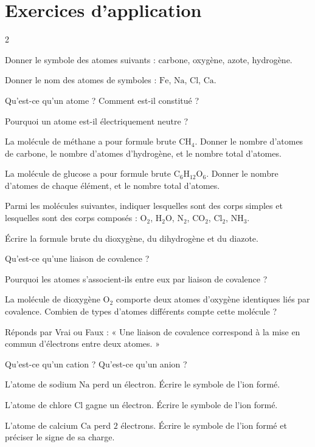 \section{Exercices d'application}
\begin{multicols}{2}

\exo{} Donner le symbole des atomes suivants : carbone, oxygène, azote,
hydrogène.

\exo{} Donner le nom des atomes de symboles : $\mathrm{Fe}$, $\mathrm{Na}$,
$\mathrm{Cl}$, $\mathrm{Ca}$.

\exo{} Qu'est-ce qu'un atome ? Comment est-il constitué ?

\exo{} Pourquoi un atome est-il électriquement neutre ?

\exo{} La molécule de méthane a pour formule brute $\mathrm{CH_4}$. Donner le
nombre d'atomes de carbone, le nombre d'atomes d'hydrogène, et le nombre total d'atomes.

\exo{} La molécule de glucose a pour formule brute $\mathrm{C_6H_{12}O_6}$. Donner
le nombre d'atomes de chaque élément, et le nombre total d'atomes.

\exo{} Parmi les molécules suivantes, indiquer lesquelles sont des corps simples et
lesquelles sont des corps composés : $\mathrm{O_2}$, $\mathrm{H_2O}$, $\mathrm{N_2}$,
$\mathrm{CO_2}$, $\mathrm{Cl_2}$, $\mathrm{NH_3}$.

\exo{} Écrire la formule brute du dioxygène, du dihydrogène et du diazote.

\exo{} Qu'est-ce qu'une liaison de covalence ?

\exo{} Pourquoi les atomes s'associent-ils entre eux par liaison de covalence ?

\exo{} La molécule de dioxygène $\mathrm{O_2}$ comporte deux atomes d'oxygène
identiques liés par covalence. Combien de types d'atomes différents compte cette
molécule ?

\exo{} Réponds par Vrai ou Faux : « Une liaison de covalence correspond à la mise
en commun d'électrons entre deux atomes. »

\exo{} Qu'est-ce qu'un cation ? Qu'est-ce qu'un anion ?

\exo{} L'atome de sodium $\mathrm{Na}$ perd un électron. Écrire le symbole de
l'ion formé.

\exo{} L'atome de chlore $\mathrm{Cl}$ gagne un électron. Écrire le symbole de
l'ion formé.

\exo{} L'atome de calcium $\mathrm{Ca}$ perd $2$ électrons. Écrire le symbole de
l'ion formé et préciser le signe de sa charge.

\end{multicols}

